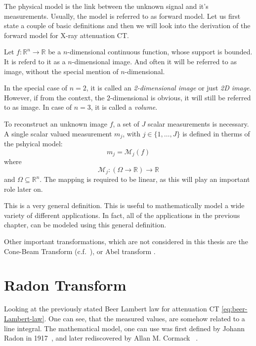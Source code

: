 The physical model is the link between the unknown signal and it's measurements. Usually, the model
is referred to as forward model. Let us first state a couple of basic definitions and then we will
look into the derivation of the forward model for X-ray attenuation CT\@.

\begin{definition}[Image]\label{def:image}
	Let \(f\colon \mathbb{R}^n \to \mathbb{R}\) be a \(n\)-dimensional continuous function,
	whose support is bounded. It is referd to it as a \(n\)-dimensional image. And often it will
	be referred to as image, without the special mention of \(n\)-dimensional.
\end{definition}


In the special case of \(n=2\), it is called an \textit{2-dimensional image} or just
\textit{2D image}. However, if from the context, the \(2\)-dimensional is obvious, it will still be
referred to as image. In case of \(n=3\), it is called a \textit{volume}.

\begin{definition}\label{def:forward-model}
	To reconstruct an unknown image \(f\), a set of \(J\) scalar measurements is necessary.
	A single scalar valued measurement \(m_j\), with \(j \in \{1, \dots, J\}\) is defined in therms
	of the pshyical model:
	\[ m_j = \mathscr{M}_j(f)\]
	where
	\[ \mathscr{M}_j\colon (\Omega \to \mathbb{R}) \to \mathbb{R} \]
	and \(\Omega \subseteq \mathbb{R}^n\). The mapping is required to be linear, as this will play an
	important role later on.
\end{definition}

This is a very general definition. This is useful to mathematically model a wide variety of
different applications. In fact, all of the applications in the previous chapter, can be modeled
using this general definition.

Other important transformations, which are not considered in this thesis are the Cone-Beam Transform
(c.f.~\cite[chap 2]{carpio_inverse_2008}), or Abel transform .

\section{Radon Transform}\label{sec:radon_transform}

Looking at the previously stated Beer Lambert law for attenuation CT \autoref{eq:beer-Lambert-law}.
One can see, that the measured values, are somehow related to a line integral. The mathematical
model, one can use was first defined by Johann Radon in
1917~\cite{radon_uber_1917,radon_determination_1986}, and later rediscovered by Allan M. Cormack
~\cite{cormack_representation_1963}.

